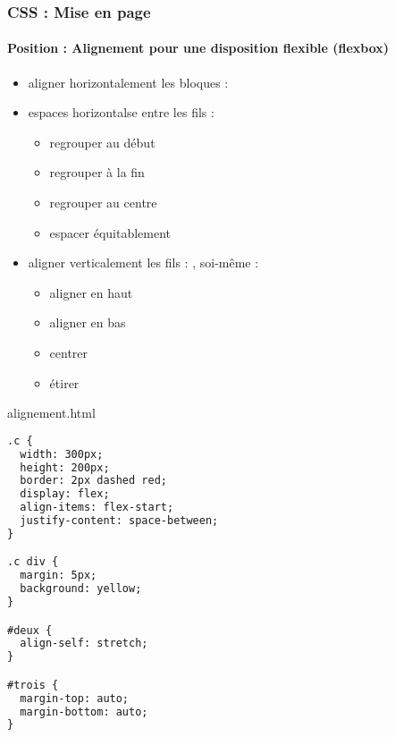 \documentclass[xcolor=table]{beamer}
\begin{document}
\begin{frame}[fragile]
\frametitle{CSS : Mise en page}
\framesubtitle{Position : Alignement pour une disposition flexible (flexbox)}

\begin{minipage}{0.60\textwidth}
	\begin{itemize}
		\item aligner horizontalement les bloques : 
		\item espaces horizontalse entre les fils : 
		\begin{itemize}
			\item {} regrouper au début
			\item {} regrouper à la fin
			\item {} regrouper au centre
			\item {} espacer équitablement
		\end{itemize}
		\item aligner verticalement les fils : , soi-même : 
		\begin{itemize}
			\item {} aligner en haut
			\item {} aligner en bas
			\item {} centrer
			\item {} étirer
		\end{itemize}
	\end{itemize}
\end{minipage}
%
\begin{minipage}{0.38\textwidth}
	\begin{exampleblock}{alignement.html}
		\lstset{escapeinside=**}
		\tiny\bfseries\vspace{-6pt}
\begin{lstlisting}[language={html}]
.c {
  width: 300px;
  height: 200px;
  border: 2px dashed red;
  display: flex;
  align-items: flex-start;
  justify-content: space-between;
}

.c div {
  margin: 5px;
  background: yellow;
}

#deux {
  align-self: stretch;
}

#trois {
  margin-top: auto;
  margin-bottom: auto;
}
\end{lstlisting}\vspace{-6pt}
	\end{exampleblock}
\end{minipage}
\end{frame}
\end{document}

